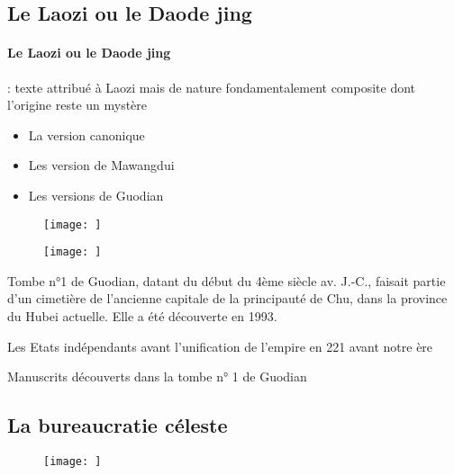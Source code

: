  \subsection{Le Laozi ou le Daode jing }

\paragraph{Le Laozi ou le Daode jing} : texte attribué à Laozi mais de nature fondamentalement composite dont l’origine reste un mystère
\begin{itemize}
    \item 	La version canonique

    \item 	Les version de Mawangdui

    \item 	Les versions de Guodian
\end{itemize}

 \begin{figure}[!h]
    \centering
    \texttt{[image: ]}

    \label{fig:enter-label}
\end{figure}


 


 \begin{figure}[!h]
    \centering
    \texttt{[image: ]}

    \label{fig:enter-label}
\end{figure}

 
Tombe n°1 de Guodian, datant du début du 4ème siècle av. J.-C., faisait partie d’un cimetière de l’ancienne capitale de la principauté de Chu, dans la province du Hubei actuelle. Elle a été découverte en 1993.

   
 
Les Etats indépendants avant l’unification de l’empire en 221 avant notre ère
  
Manuscrits découverts dans la tombe n° 1 de Guodian

 

\subsection{La bureaucratie céleste}
 \begin{figure}[!h]
    \centering
    \texttt{[image: ]}

    \label{fig:enter-label}
\end{figure}





